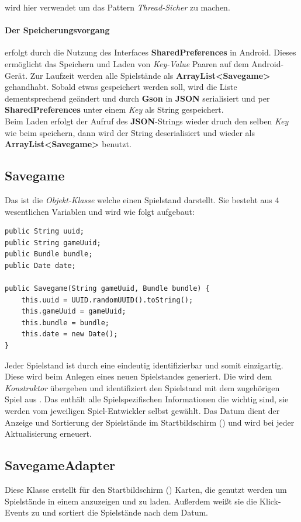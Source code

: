  wird hier verwendet um das Pattern \emph{Thread-Sicher} zu
machen.

\paragraph{Der Speicherungsvorgang} erfolgt durch die Nutzung des Interfaces
\textbf{SharedPreferences} in Android. Dieses ermöglicht das Speichern und Laden
von \emph{Key-Value} Paaren auf dem Android-Gerät. Zur Laufzeit werden alle
Spielstände als \textbf{ArrayList\textless Savegame\textgreater} gehandhabt.
Sobald etwas gespeichert werden soll, wird die Liste dementsprechend geändert
und durch \textbf{Gson} in \textbf{JSON} serialisiert und per
\textbf{SharedPreferences} unter einem \emph{Key} als String gespeichert.\\ Beim
Laden erfolgt der Aufruf des \textbf{JSON}-Strings wieder druch den selben
\emph{Key} wie beim speichern, dann wird der String deserialisiert und wieder
als \textbf{ArrayList\textless Savegame\textgreater} benutzt.

\subsection{Savegame}

Das ist die \emph{Objekt-Klasse} welche einen Spielstand darstellt. Sie besteht
aus 4 wesentlichen Variablen und wird wie folgt aufgebaut:
\begin{lstlisting}[caption={Savegame Variablen \& Konstruktor},captionpos=b]
public String uuid;
public String gameUuid;
public Bundle bundle;
public Date date;

public Savegame(String gameUuid, Bundle bundle) {
	this.uuid = UUID.randomUUID().toString();
	this.gameUuid = gameUuid;
	this.bundle = bundle;
	this.date = new Date();
}
\end{lstlisting}

Jeder Spielstand ist durch eine  eindeutig identifizierbar und somit
einzigartig. Diese wird beim Anlegen eines neuen Spielstandes generiert.  Die
 wird dem \emph{Konstruktor} übergeben und identifiziert den
Spielstand mit dem zugehörigen Spiel aus .  Das 
enthält alle Spielspezifischen Informationen die wichtig sind, sie werden vom
jeweiligen Spiel-Entwickler selbst gewählt.  Das Datum dient der Anzeige und
Sortierung der Spielstände im Startbildschirm () und wird bei jeder
Aktualisierung erneuert.

\subsection{SavegameAdapter}
Diese Klasse erstellt für den Startbildschirm () Karten, die
genutzt werden um Spielstände in einem  anzuzeigen und zu laden.
Außerdem weißt sie die Klick-Events zu und sortiert die Spielstände nach dem Datum.

